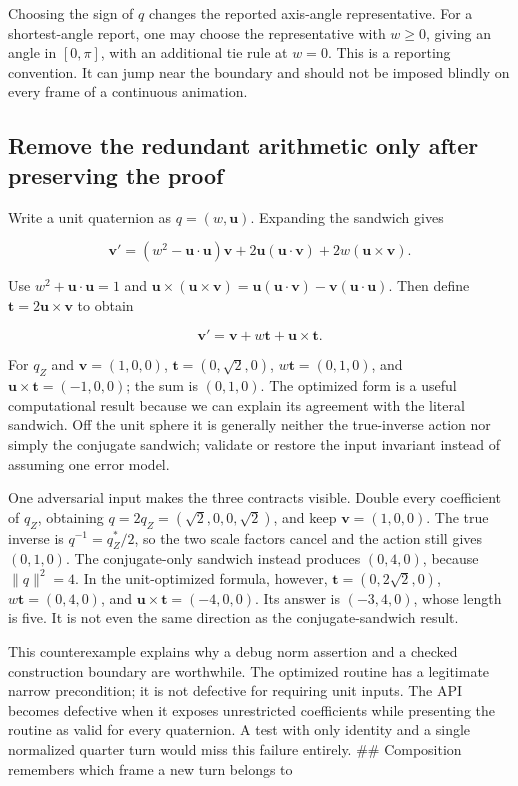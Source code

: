 Choosing the sign of \(q\) changes the reported axis-angle representative. For a shortest-angle report, one may choose the representative with \(w\ge0\), giving an angle in \([0,\pi]\), with an additional tie rule at \(w=0\). This is a reporting convention. It can jump near the boundary and should not be imposed blindly on every frame of a continuous animation.

\subsection{Remove the redundant arithmetic only after preserving the proof}\label{01-foundations-i-ch019-remove-the-redundant-arithmetic-only-after-preserving-the-proof}

Write a unit quaternion as \(q=(w,\mathbf u)\). Expanding the sandwich gives

\[
\mathbf v'=(w^2-\mathbf u\cdot\mathbf u)\mathbf v
+2\mathbf u(\mathbf u\cdot\mathbf v)
+2w(\mathbf u\times\mathbf v).
\]

Use \(w^2+\mathbf u\cdot\mathbf u=1\) and \(\mathbf u\times(\mathbf u\times\mathbf v)=\mathbf u(\mathbf u\cdot\mathbf v)-\mathbf v(\mathbf u\cdot\mathbf u)\). Then define \(\mathbf t=2\mathbf u\times\mathbf v\) to obtain

\[
\mathbf v'=\mathbf v+w\mathbf t+\mathbf u\times\mathbf t.
\]

For \(q_Z\) and \(\mathbf v=(1,0,0)\), \(\mathbf t=(0,\sqrt2,0)\), \(w\mathbf t=(0,1,0)\), and \(\mathbf u\times\mathbf t=(-1,0,0)\); the sum is \((0,1,0)\). The optimized form is a useful computational result because we can explain its agreement with the literal sandwich. Off the unit sphere it is generally neither the true-inverse action nor simply the conjugate sandwich; validate or restore the input invariant instead of assuming one error model.

One adversarial input makes the three contracts visible. Double every coefficient of \(q_Z\), obtaining \(q=2q_Z=(\sqrt2,0,0,\sqrt2)\), and keep \(\mathbf v=(1,0,0)\). The true inverse is \(q^{-1}=q_Z^*/2\), so the two scale factors cancel and the action still gives \((0,1,0)\). The conjugate-only sandwich instead produces \((0,4,0)\), because \(\|q\|^2=4\). In the unit-optimized formula, however, \(\mathbf t=(0,2\sqrt2,0)\), \(w\mathbf t=(0,4,0)\), and \(\mathbf u\times\mathbf t=(-4,0,0)\). Its answer is \((-3,4,0)\), whose length is five. It is not even the same direction as the conjugate-sandwich result.

This counterexample explains why a debug norm assertion and a checked construction boundary are worthwhile. The optimized routine has a legitimate narrow precondition; it is not defective for requiring unit inputs. The API becomes defective when it exposes unrestricted coefficients while presenting the routine as valid for every quaternion. A test with only identity and a single normalized quarter turn would miss this failure entirely. \#\# Composition remembers which frame a new turn belongs to

